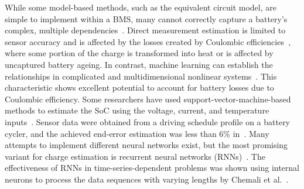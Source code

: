 %
While some model-based methods, such as the equivalent circuit model, are simple to implement within a BMS, many cannot correctly capture a battery's complex, multiple dependencies~\cite{6953745}.
Direct measurement estimation is limited to sensor accuracy and is affected by the losses created by Coulombic efficiencies~\cite{Smith_2010}, where some portion of the charge is transformed into heat or is affected by uncaptured battery ageing.
%
In contrast, machine learning can establish the relationships in complicated and multidimensional nonlinear systems~\cite{hansen_support_2005,anton_battery_2013,he_state_2014}.
This characteristic shows excellent potential to account for battery losses due to Coulombic efficiency.
Some researchers have used support-vector-machine-based methods to estimate the SoC using the voltage, current, and temperature inputs~\cite{hansen_support_2005,anton_battery_2013}.
Sensor data were obtained from a driving schedule profile on a battery cycler, and the achieved end-error estimation was less than 6\% in~\cite{he_state_2014}.
Many attempts to implement different neural networks exist, but the most promising variant for charge estimation is recurrent neural networks (RNNs)~\cite{song_lithium-ion_2018, Chemali2017, mamo_long_2020, jiao_gru-rnn_2020, xiao_accurate_2019, javid_adaptive_2020, zhang_deep_2020}.
The effectiveness of RNNs in time-series-dependent problems was shown using internal neurons to process the data sequences with varying lengths by Chemali et al.~\cite{Chemali2017}.

